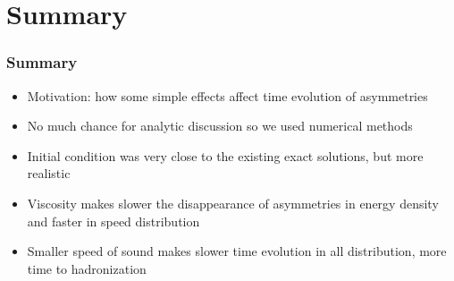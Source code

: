 \documentclass{beamer}
\begin{document}
\section{Summary}
\begin{frame}
\frametitle{Summary}
\begin{itemize}
\item Motivation: how some simple effects affect time evolution of asymmetries
\item No much chance for analytic discussion so we used numerical methods
\item Initial condition was very close to the existing exact solutions, but more realistic
\item Viscosity makes slower the disappearance of asymmetries in energy density and faster in speed distribution
\item Smaller speed of sound makes slower time evolution in all distribution, more time to hadronization
\end{itemize}
\end{frame}
\end{document}
